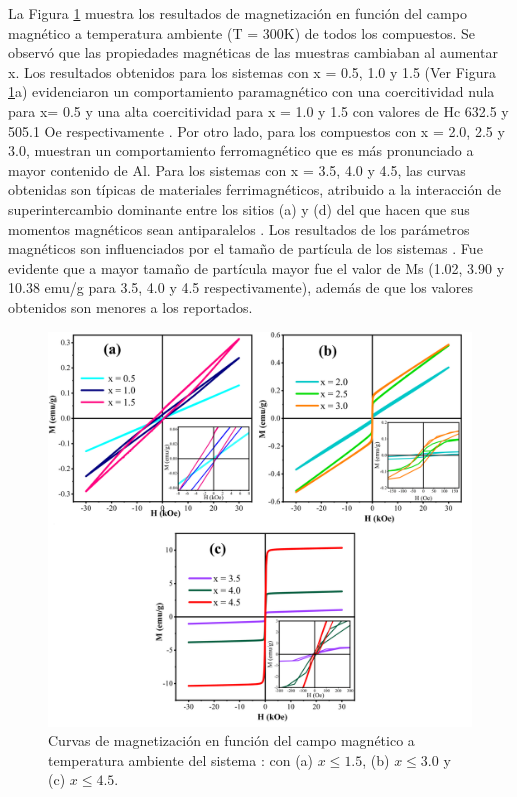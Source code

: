 La Figura \ref{fig:magneti} muestra los resultados de magnetización en función del campo
magnético a temperatura ambiente (T = 300K) de todos los compuestos. Se observó
que las propiedades magnéticas de las muestras cambiaban al aumentar x. Los
resultados obtenidos para los sistemas con x = 0.5, 1.0 y 1.5 (Ver Figura
\ref{fig:magneti}a)
evidenciaron un comportamiento paramagnético con una coercitividad nula para x=
0.5
y una alta coercitividad para x = 1.0 y 1.5 con valores de Hc 632.5 y
505.1 Oe respectivamente \cite{musa2017structural}. Por otro lado, para los compuestos con x =
2.0,
2.5 y 3.0, muestran un comportamiento ferromagnético que es más pronunciado a
mayor contenido de Al. Para los sistemas con x = 3.5, 4.0 y 4.5, las curvas
obtenidas son típicas de materiales ferrimagnéticos, atribuido a la interacción
de superintercambio dominante entre los sitios (a) y (d) del  que hacen
que
sus momentos magnéticos sean antiparalelos \cite{yamagishi2005ferrimagnetic}. Los resultados de los
parámetros magnéticos son influenciados por el tamaño de partícula de los
sistemas
\cite{tan2008room}. Fue evidente que a mayor tamaño de partícula mayor fue el valor de Ms
(1.02, 3.90 y 10.38 emu/g para 3.5, 4.0 y 4.5 respectivamente), además de que
los valores obtenidos son menores a los reportados.\\

\begin{figure}[h]
  \centering%

  \includegraphics[width=\textwidth]{Kap6/MH.png}%
  \caption{Curvas de magnetización en función del campo magnético a
  temperatura
  ambiente del sistema :  con (a) $x \leq 1.5$, (b) $x \leq 3.0$ y (c)  $x \leq 4.5$. }\label{fig:magneti}
\end{figure}

